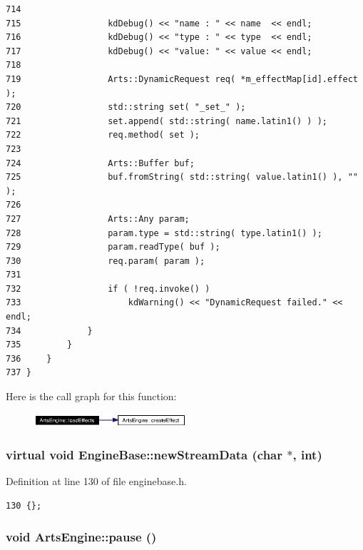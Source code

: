 \begin{verbatim}
714 
715                 kdDebug() << "name : " << name  << endl;
716                 kdDebug() << "type : " << type  << endl;
717                 kdDebug() << "value: " << value << endl;
718 
719                 Arts::DynamicRequest req( *m_effectMap[id].effect );
720                 std::string set( "_set_" );
721                 set.append( std::string( name.latin1() ) );
722                 req.method( set );
723 
724                 Arts::Buffer buf;
725                 buf.fromString( std::string( value.latin1() ), "" );
726 
727                 Arts::Any param;
728                 param.type = std::string( type.latin1() );
729                 param.readType( buf );
730                 req.param( param );
731 
732                 if ( !req.invoke() )
733                     kdWarning() << "DynamicRequest failed." << endl;
734             }
735         }
736     }
737 }
\end{verbatim}\normalsize 


Here is the call graph for this function:\begin{figure}[H]
\begin{center}
\leavevmode
\includegraphics[width=160pt]{classArtsEngine_ArtsEngined2_cgraph}
\end{center}
\end{figure}
\subsubsection{\setlength{\rightskip}{0pt plus 5cm}virtual void Engine\-Base::new\-Stream\-Data (char $\ast$, int)\hspace{0.3cm}{\tt  [inline, virtual, slot, inherited]}}\label{classEngineBase_EngineBasei7}




Definition at line 130 of file enginebase.h.



\footnotesize\begin{verbatim}130 {};
\end{verbatim}\normalsize 
{}
\subsubsection{\setlength{\rightskip}{0pt plus 5cm}void Arts\-Engine::pause ()\hspace{0.3cm}{\tt  [virtual, slot]}}\label{classArtsEngine_ArtsEnginei3}




